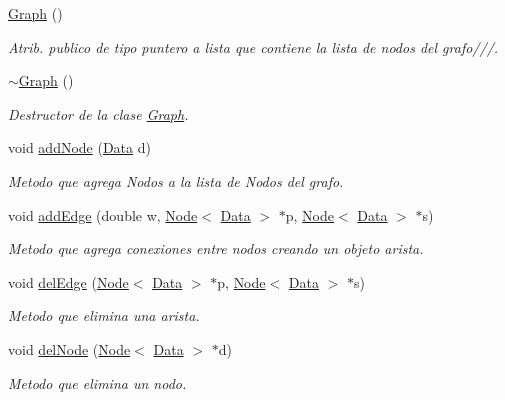 \begin{DoxyCompactItemize}
\item 
\hyperlink{class_graph_a8ef748930440a759a822f7c6c44951e7}{Graph} ()
\begin{DoxyCompactList}\small\item\em Atrib. publico de tipo puntero a lista que contiene la lista de nodos del grafo///. \end{DoxyCompactList}\item 
\hyperlink{class_graph_a9ee23093ccf3a80df54838637e33fffd}{$\sim$\+Graph} ()
\begin{DoxyCompactList}\small\item\em Destructor de la clase \hyperlink{class_graph}{Graph}. \end{DoxyCompactList}\item 
void \hyperlink{class_graph_aad2f858eee99cbe448a8360c76357f09}{add\+Node} (\hyperlink{class_data}{Data} d)
\begin{DoxyCompactList}\small\item\em Metodo que agrega Nodos a la lista de Nodos del grafo. \end{DoxyCompactList}\item 
void \hyperlink{class_graph_a53ff2bd0e8925335198ecb06b86443e3}{add\+Edge} (double w, \hyperlink{class_node}{Node}$<$ \hyperlink{class_data}{Data} $>$ $\ast$p, \hyperlink{class_node}{Node}$<$ \hyperlink{class_data}{Data} $>$ $\ast$s)
\begin{DoxyCompactList}\small\item\em Metodo que agrega conexiones entre nodos creando un objeto arista. \end{DoxyCompactList}\item 
void \hyperlink{class_graph_a96a41f6820bf0ef9c40b4e748a6a447b}{del\+Edge} (\hyperlink{class_node}{Node}$<$ \hyperlink{class_data}{Data} $>$ $\ast$p, \hyperlink{class_node}{Node}$<$ \hyperlink{class_data}{Data} $>$ $\ast$s)
\begin{DoxyCompactList}\small\item\em Metodo que elimina una arista. \end{DoxyCompactList}\item 
void \hyperlink{class_graph_a2d4f6aaaf01d42b86adc62722fca1708}{del\+Node} (\hyperlink{class_node}{Node}$<$ \hyperlink{class_data}{Data} $>$ $\ast$d)
\begin{DoxyCompactList}\small\item\em Metodo que elimina un nodo. \end{DoxyCompactList}\item 

\end{DoxyCompactItemize}
